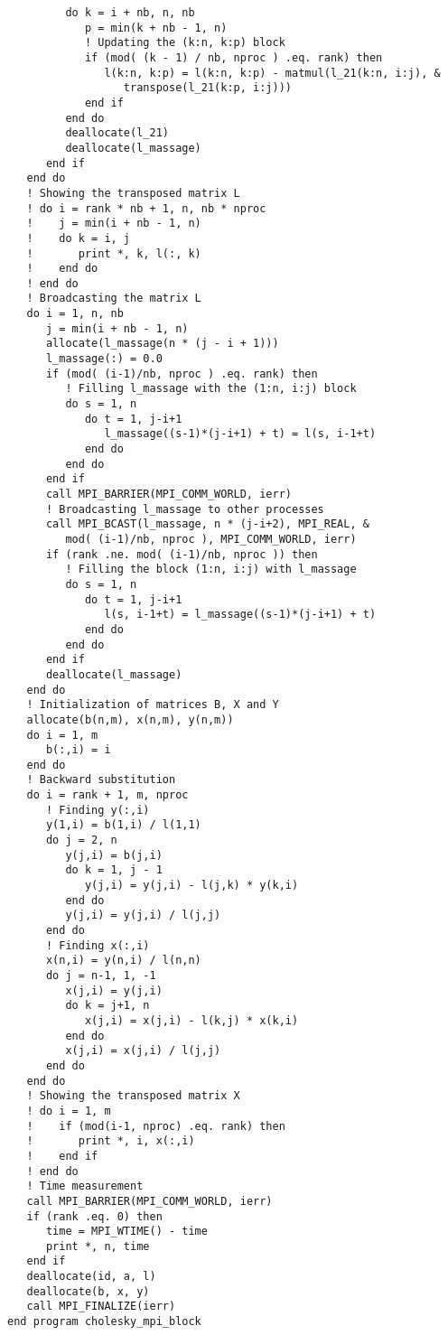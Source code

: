 \begin{lstlisting}
         do k = i + nb, n, nb
            p = min(k + nb - 1, n)
            ! Updating the (k:n, k:p) block
            if (mod( (k - 1) / nb, nproc ) .eq. rank) then
               l(k:n, k:p) = l(k:n, k:p) - matmul(l_21(k:n, i:j), &
                  transpose(l_21(k:p, i:j)))
            end if
         end do
         deallocate(l_21)
         deallocate(l_massage)
      end if
   end do
   ! Showing the transposed matrix L
   ! do i = rank * nb + 1, n, nb * nproc
   !    j = min(i + nb - 1, n)
   !    do k = i, j
   !       print *, k, l(:, k)
   !    end do
   ! end do
   ! Broadcasting the matrix L
   do i = 1, n, nb
      j = min(i + nb - 1, n)
      allocate(l_massage(n * (j - i + 1)))
      l_massage(:) = 0.0
      if (mod( (i-1)/nb, nproc ) .eq. rank) then
         ! Filling l_massage with the (1:n, i:j) block
         do s = 1, n
            do t = 1, j-i+1
               l_massage((s-1)*(j-i+1) + t) = l(s, i-1+t)
            end do
         end do
      end if
      call MPI_BARRIER(MPI_COMM_WORLD, ierr)
      ! Broadcasting l_massage to other processes
      call MPI_BCAST(l_massage, n * (j-i+2), MPI_REAL, &
         mod( (i-1)/nb, nproc ), MPI_COMM_WORLD, ierr)
      if (rank .ne. mod( (i-1)/nb, nproc )) then
         ! Filling the block (1:n, i:j) with l_massage
         do s = 1, n
            do t = 1, j-i+1
               l(s, i-1+t) = l_massage((s-1)*(j-i+1) + t)
            end do
         end do
      end if
      deallocate(l_massage)
   end do
   ! Initialization of matrices B, X and Y
   allocate(b(n,m), x(n,m), y(n,m))
   do i = 1, m
      b(:,i) = i
   end do
   ! Backward substitution
   do i = rank + 1, m, nproc
      ! Finding y(:,i)
      y(1,i) = b(1,i) / l(1,1)
      do j = 2, n
         y(j,i) = b(j,i)
         do k = 1, j - 1
            y(j,i) = y(j,i) - l(j,k) * y(k,i)
         end do
         y(j,i) = y(j,i) / l(j,j)
      end do
      ! Finding x(:,i)
      x(n,i) = y(n,i) / l(n,n)
      do j = n-1, 1, -1
         x(j,i) = y(j,i)
         do k = j+1, n
            x(j,i) = x(j,i) - l(k,j) * x(k,i)
         end do
         x(j,i) = x(j,i) / l(j,j)
      end do 
   end do
   ! Showing the transposed matrix X
   ! do i = 1, m
   !    if (mod(i-1, nproc) .eq. rank) then
   !       print *, i, x(:,i)
   !    end if
   ! end do
   ! Time measurement
   call MPI_BARRIER(MPI_COMM_WORLD, ierr)
   if (rank .eq. 0) then
      time = MPI_WTIME() - time
      print *, n, time
   end if
   deallocate(id, a, l)
   deallocate(b, x, y)
   call MPI_FINALIZE(ierr)
end program cholesky_mpi_block


\end{lstlisting}
